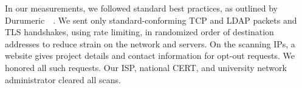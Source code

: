 







In our measurements, we followed standard best practices, as outlined by Durumeric~\etal~\cite{durumeric2013zmap}. We sent only standard-conforming TCP and \acrshort{LDAP} packets and TLS handshakes, using rate limiting, in randomized order of destination addresses to reduce strain on the network and servers. On the scanning IPs, a website gives project details and contact information for opt-out requests. We honored all such requests. Our ISP, national CERT, and university network administrator cleared all scans.



